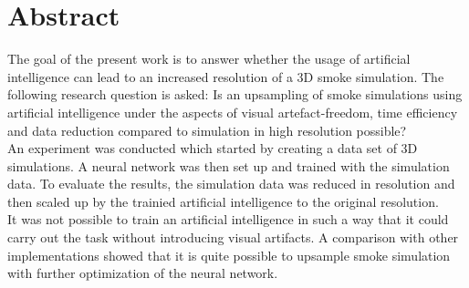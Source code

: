 \chapter*{Abstract}
\thispagestyle{plain}

The goal of the present work is to answer whether the usage of artificial intelligence can lead to an increased resolution of a 3D smoke simulation. The following research question is asked: Is an upsampling of smoke simulations using artificial intelligence under the aspects of visual artefact-freedom, time efficiency and data reduction compared to simulation in high resolution possible?\\

An experiment was conducted which started by creating a data set of 3D simulations. A neural network was then set up and trained with the simulation data. To evaluate the results, the simulation data was reduced in resolution and then scaled up by the trainied artificial intelligence to the original resolution.\\

It was not possible to train an artificial intelligence in such a way that it could carry out the task without introducing visual artifacts. A comparison with other implementations showed that it is quite possible to upsample smoke simulation with further optimization of the neural network.\\